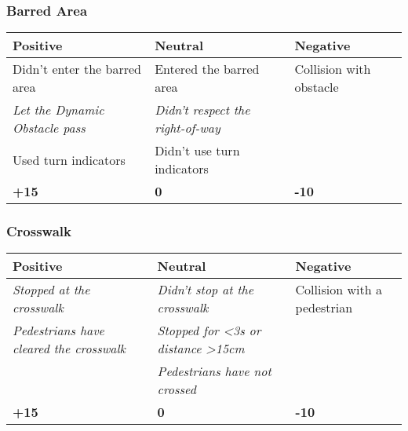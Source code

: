 {\subsubsection*{Barred Area}
\begin{table}[H]
    \begin{tabularx}{\textwidth}{@{}XXX@{}}
        \toprule
        \textbf{Positive}                                      & \textbf{Neutral}                                         & \textbf{Negative}       \\
        \midrule
        Didn't enter the barred area                           & Entered the barred area                                  & Collision with obstacle \\
        \textit{Let the Dynamic Obstacle pass}\footnotemark[1] & \textit{Didn't respect the right-of-way}\footnotemark[1] &                         \\
        Used turn indicators                                   & Didn't use turn indicators                               &                         \\
        \textbf{+15}                                           & \textbf{0}                                               & \textbf{-10}            \\
        \bottomrule
    \end{tabularx}
\end{table}

\subsubsection*{Crosswalk}
\begin{table}[H]
    \begin{tabularx}{\textwidth}{@{}XXX@{}}
        \toprule
        \textbf{Positive}                                               & \textbf{Neutral}                                           & \textbf{Negative}           \\
        \midrule
        \textit{Stopped at the crosswalk}\footnotemark[2]               & \textit{Didn't stop at the crosswalk}\footnotemark[2]      & Collision with a pedestrian \\
        \textit{Pedestrians have cleared the crosswalk}\footnotemark[2] & \textit{Stopped for <3s or distance >15cm}\footnotemark[2] &                             \\
                                                                        & \textit{Pedestrians have not crossed}\footnotemark[2]      &                             \\
        \textbf{+15}                                                    & \textbf{0}                                                 & \textbf{-10}                \\
        \bottomrule
    \end{tabularx}
\end{table}

}
